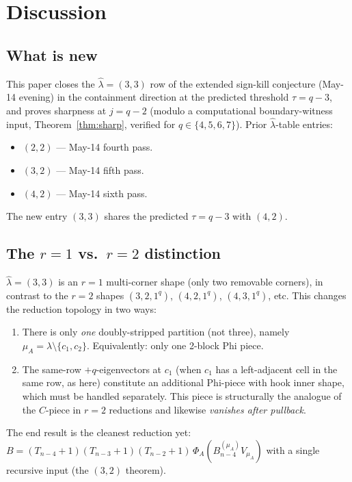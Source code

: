 \documentclass[11pt]{article}
\theoremstyle{definition}
\newcommand{\hatl}{\widehat\lambda}
\begin{document}
\section{Discussion}\label{sec:discussion}

\subsection{What is new}

This paper closes the $\hatl = (3, 3)$ row of the extended sign-kill
conjecture (May-14 evening) in the containment direction at the
predicted threshold $\tau = q - 3$, and proves sharpness at $j = q - 2$
(modulo a computational boundary-witness input, Theorem~\ref{thm:sharp},
verified for $q \in \{4, 5, 6, 7\}$).  Prior $\hatl$-table entries:
\begin{itemize}[topsep=0.3em,itemsep=0.1em]
\item $(2, 2)$ --- May-14 fourth pass.
\item $(3, 2)$ --- May-14 fifth pass.
\item $(4, 2)$ --- May-14 sixth pass.
\end{itemize}
The new entry $(3, 3)$ shares the predicted $\tau = q - 3$ with
$(4, 2)$.

\subsection{The $r = 1$ vs.\ $r = 2$ distinction}

$\hatl = (3, 3)$ is an \emph{$r = 1$} multi-corner shape (only two
removable corners), in contrast to the $r = 2$ shapes
$(3, 2, 1^q)$, $(4, 2, 1^q)$, $(4, 3, 1^q)$, etc.  This changes the
reduction topology in two ways:
\begin{enumerate}[topsep=0.3em,itemsep=0.1em,leftmargin=2em]
\item There is only \emph{one} doubly-stripped partition (not three),
   namely $\mu_A = \lambda \setminus \{c_1, c_2\}$.  Equivalently:
   only one 2-block Phi piece.
\item The same-row $+q$-eigenvectors at $c_1$ (when $c_1$ has a
   left-adjacent cell in the same row, as here) constitute an
   additional Phi-piece with hook inner shape, which must be
   handled separately.  This piece is structurally the analogue of
   the $C$-piece in $r = 2$ reductions and likewise \emph{vanishes
   after pullback}.
\end{enumerate}
The end result is the cleanest reduction yet: $B = (T_{n-4}+1)(T_{n-3}+1)(T_{n-2}+1)\,\Phi_A(B^{(\mu_A)}_{n-4} V_{\mu_A})$
with a single recursive input (the $(3, 2)$ theorem).
\end{document}

